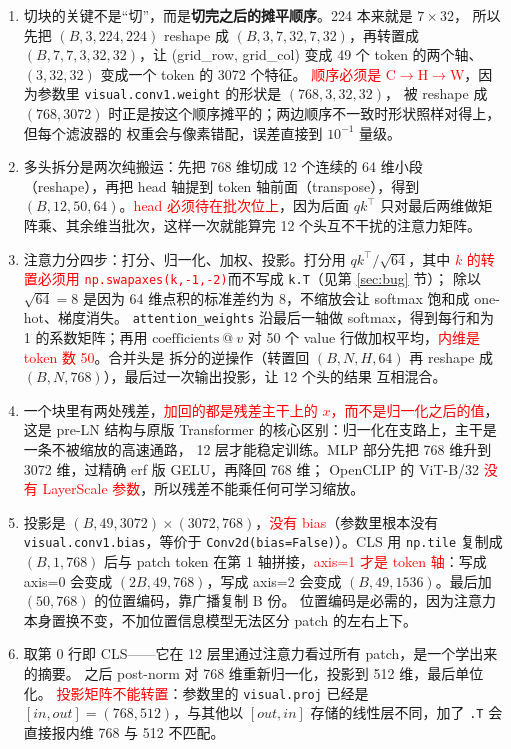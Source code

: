 \documentclass[a4paper,12pt]{article}
\newcommand{\mine}[1]{\textcolor{red}{#1}}
\begin{document}
\begin{enumerate}

\item[TODO-01] 切块的关键不是“切”，而是\textbf{切完之后的摊平顺序}。224 本来就是 $7\times32$，
所以先把 $(B,3,224,224)$ reshape 成 $(B,3,7,32,7,32)$，再转置成 $(B,7,7,3,32,32)$，让
(grid\_row, grid\_col) 变成 49 个 token 的两个轴、$(3,32,32)$ 变成一个 token 的 3072 个特征。
\mine{顺序必须是 C$\to$H$\to$W}，因为参数里 \texttt{visual.conv1.weight} 的形状是 $(768,3,32,32)$，
被 reshape 成 $(768,3072)$ 时正是按这个顺序摊平的；两边顺序不一致时形状照样对得上，但每个滤波器的
权重会与像素错配，误差直接到 $10^{-1}$ 量级。

\item[TODO-02] 多头拆分是两次纯搬运：先把 768 维切成 12 个连续的 64 维小段（reshape），再把 head
轴提到 token 轴前面（transpose），得到 $(B,12,50,64)$。\mine{head 必须待在批次位上}，因为后面
$q k^{\top}$ 只对最后两维做矩阵乘、其余维当批次，这样一次就能算完 12 个头互不干扰的注意力矩阵。

\item[TODO-03] 注意力分四步：打分、归一化、加权、投影。打分用 $q k^{\top}/\sqrt{64}$，其中
\mine{$k$ 的转置必须用 \texttt{np.swapaxes(k,-1,-2)}}而不写成 \texttt{k.T}（见第 \ref{sec:bug} 节）；
除以 $\sqrt{64}=8$ 是因为 64 维点积的标准差约为 8，不缩放会让 softmax 饱和成 one-hot、梯度消失。
\texttt{attention\_weights} 沿最后一轴做 softmax，得到每行和为 1 的系数矩阵；再用
$\mathrm{coefficients}\ @\ v$ 对 50 个 value 行做加权平均，\mine{内维是 token 数 50}。合并头是
拆分的逆操作（转置回 $(B,N,H,64)$ 再 reshape 成 $(B,N,768)$），最后过一次输出投影，让 12 个头的结果
互相混合。

\item[TODO-04] 一个块里有两处残差，\mine{加回的都是残差主干上的 $x$，而不是归一化之后的值}，
这是 pre-LN 结构与原版 Transformer 的核心区别：归一化在支路上，主干是一条不被缩放的高速通路，
12 层才能稳定训练。MLP 部分先把 768 维升到 3072 维，过精确 erf 版 GELU，再降回 768 维；
OpenCLIP 的 ViT-B/32 \mine{没有 LayerScale 参数}，所以残差不能乘任何可学习缩放。

\item[TODO-05] 投影是 $(B,49,3072)\times(3072,768)$，\mine{没有 bias}（参数里根本没有
\texttt{visual.conv1.bias}，等价于 \texttt{Conv2d(bias=False)}）。CLS 用 \texttt{np.tile} 复制成
$(B,1,768)$ 后与 patch token 在第 1 轴拼接，\mine{axis=1 才是 token 轴}：写成 axis=0 会变成
$(2B,49,768)$，写成 axis=2 会变成 $(B,49,1536)$。最后加 $(50,768)$ 的位置编码，靠广播复制 B 份。
位置编码是必需的，因为注意力本身置换不变，不加位置信息模型无法区分 patch 的左右上下。

\item[TODO-06] 取第 0 行即 CLS——它在 12 层里通过注意力看过所有 patch，是一个学出来的摘要。
之后 post-norm 对 768 维重新归一化，投影到 512 维，最后单位化。
\mine{投影矩阵不能转置}：参数里的 \texttt{visual.proj} 已经是 $[in,out]=(768,512)$，与其他以
$[out,in]$ 存储的线性层不同，加了 \texttt{.T} 会直接报内维 768 与 512 不匹配。

\end{enumerate}
\end{document}
